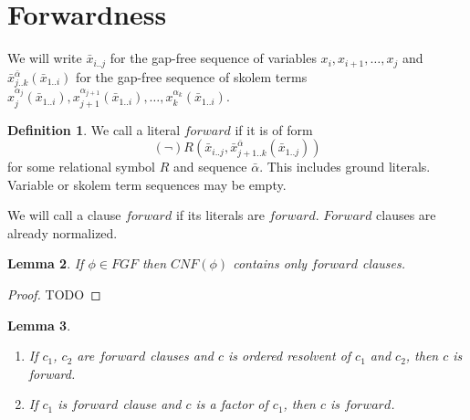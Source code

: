 \documentclass[english, shortabstract]{iithesis}
\theoremstyle{definition} \newtheorem{definition}{Definition}[chapter]
\theoremstyle{remark} \newtheorem{remark}[definition]{Observation}
\theoremstyle{plain} \newtheorem{theorem}[definition]{Theorem}
\theoremstyle{plain} \newtheorem{lemma}[definition]{Lemma}
\begin{document}
\section{Forwardness}

We will write $\bar{x}_{i..j}$ for the gap-free sequence of variables $x_i, x_{i+1}, \dots, x_j$ and 
$\bar{x}^{\bar{\alpha}}_{j..k}(\bar{x}_{1..i})$ for the gap-free sequence of skolem terms $x^{\alpha_j}_{j}(\bar{x}_{1..i}), x^{\alpha_{j+1}}_{j+1}(\bar{x}_{1..i}), \dots, x^{\alpha_k}_k(\bar{x}_{1..i})$.

\begin{definition}
We call a literal $forward$ if it is of form
$$(\lnot)R(\bar{x}_{i..j}, \bar{x}^{\bar{\alpha}}_{{j+1..k}}(\bar{x}_{1..j}))$$
for some relational symbol $R$ and sequence $\bar{\alpha}$. This includes ground literals. Variable or skolem term sequences may be empty.
\end{definition}

We will call a clause $forward$ if its literals are $forward$. $Forward$ clauses are already normalized.

\begin{lemma}
If $\phi \in FGF$ then $CNF(\phi)$ contains only $forward$ clauses.
\end{lemma}

\begin{proof}
TODO
\end{proof}

\begin{lemma}
\begin{enumerate}
    \item If $c_1$, $c_2$ are $forward$ clauses and $c$ is ordered resolvent of $c_1$ and $c_2$, then $c$ is forward.
    \item If $c_1$ is $forward$ clause and $c$ is a factor of $c_1$, then $c$ is $forward$.  
\end{enumerate}
\end{lemma}
\end{document}
